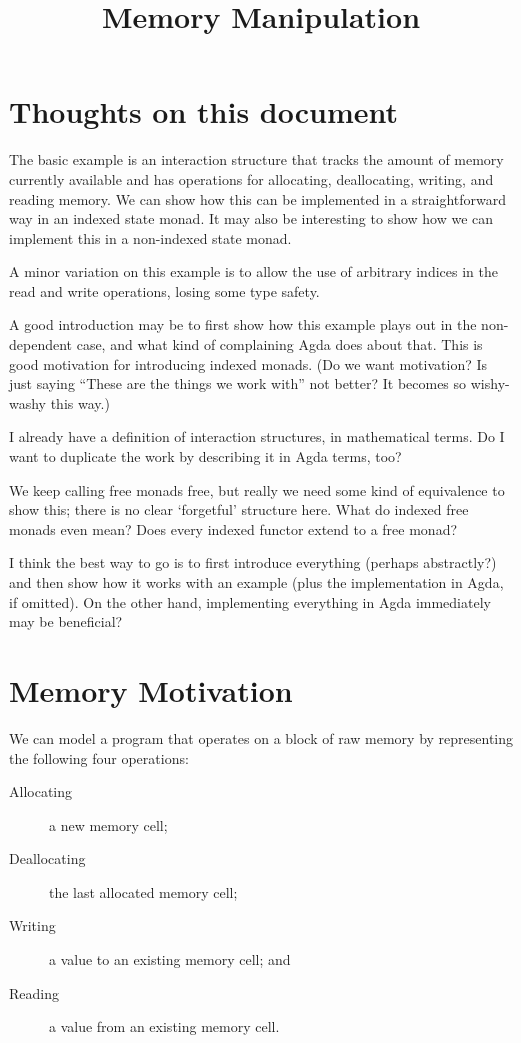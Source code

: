 \documentclass{article}
\title{\vspace{-2cm}Memory Manipulation}
\theoremstyle{definition}
\begin{document}
    \maketitle

    \section*{Thoughts on this document}

    The basic example is an interaction structure that tracks the amount of memory currently available and has
    operations for allocating, deallocating, writing, and reading memory.  We can show how this can be implemented in a
    straightforward way in an indexed state monad.  It may also be interesting to show how we can implement this in a
    non-indexed state monad.

    A minor variation on this example is to allow the use of arbitrary indices in the read and write operations, losing
    some type safety.

    A good introduction may be to first show how this example plays out in the non-dependent case, and what kind of
    complaining Agda does about that.  This is good motivation for introducing indexed monads.  (Do we want motivation?
    Is just saying ``These are the things we work with'' not better?  It becomes so wishy-washy this way.)

    I already have a definition of interaction structures, in mathematical terms.  Do I want to duplicate the work by
    describing it in Agda terms, too?

    We keep calling free monads free, but really we need some kind of equivalence to show this; there is no clear
    `forgetful' structure here.  What do indexed free monads even mean?  Does every indexed functor extend to a free
    monad?

    I think the best way to go is to first introduce everything (perhaps abstractly?) and then show how it works with an
    example (plus the implementation in Agda, if omitted).  On the other hand, implementing everything in Agda
    immediately may be beneficial?

    \section{Memory Motivation}

    We can model a program that operates on a block of raw memory by representing the following four operations:
    \begin{description}
        \item[Allocating] a new memory cell;
        \item[Deallocating] the last allocated memory cell;
        \item[Writing] a value to an existing memory cell; and
        \item[Reading] a value from an existing memory cell.
    \end{description}
\end{document}
